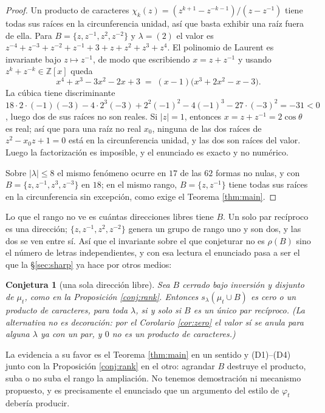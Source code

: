 \documentclass[11pt,reqno]{amsart}
\theoremstyle{plain}
\newtheorem{conjecture}[theorem]{Conjetura}
\theoremstyle{definition}
\newcommand{\ZZ}{\mathbb{Z}}
\newcommand{\zt}{\mu_t}
\begin{document}
\begin{proof}
Un producto de caracteres $\chi_k(z)=(z^{k+1}-z^{-k-1})/(z-z^{-1})$ tiene todas sus raíces en la
circunferencia unidad, así que basta exhibir una raíz fuera de ella. Para
$B=\{z,z^{-1},z^{2},z^{-2}\}$ y $\lambda=(2)$ el valor es
$z^{-4}+z^{-3}+z^{-2}+z^{-1}+3+z+z^{2}+z^{3}+z^{4}$. El polinomio de Laurent es invariante bajo
$z\mapsto z^{-1}$, de modo que escribiendo $x=z+z^{-1}$ y usando $z^{k}+z^{-k}\in\ZZ[x]$ queda
\[
x^{4}+x^{3}-3x^{2}-2x+3\;=\;(x-1)\bigl(x^{3}+2x^{2}-x-3\bigr).
\]
La cúbica tiene discriminante
$18\cdot2\cdot(-1)(-3)-4\cdot2^{3}(-3)+2^{2}(-1)^{2}-4(-1)^{3}-27\cdot(-3)^{2}=-31<0$, luego dos de
sus raíces no son reales. Si $|z|=1$, entonces $x=z+z^{-1}=2\cos\theta$ es real; así que para una
raíz no real $x_0$, ninguna de las dos raíces de $z^{2}-x_0z+1=0$ está en la circunferencia unidad, y
las dos son raíces del valor. Luego la factorización es imposible, y el enunciado es exacto y no
numérico.

Sobre $|\lambda|\le8$ el mismo fenómeno ocurre en $17$ de las $62$ formas no nulas, y con
$B=\{z,z^{-1},z^{3},z^{-3}\}$ en $18$; en el mismo rango, $B=\{z,z^{-1}\}$ tiene todas sus raíces en
la circunferencia sin excepción, como exige el Teorema \ref{thm:main}.
\end{proof}

Lo que el rango no ve es cuántas direcciones libres tiene $B$. Un solo par recíproco es una
dirección; $\{z,z^{-1},z^{2},z^{-2}\}$ genera un grupo de rango uno y son dos, y las dos se ven entre
sí. Así que el invariante sobre el que conjeturar no es $\rho(B)$ sino el número de letras
independientes, y con esa lectura el enunciado pasa a ser el que la \S\ref{sec:sharp} ya hace por
otros medios:

\begin{conjecture}[una sola dirección libre]\label{conj:rank2}
Sea $B$ cerrado bajo inversión y disjunto de $\zt$, como en la Proposición \ref{conj:rank}. Entonces
$s_\lambda(\zt\cup B)$ es cero o un producto de caracteres, para toda $\lambda$, si y solo si $B$ es
un único par recíproco. (La alternativa no es decoración: por el Corolario \ref{cor:zero} el valor sí
se anula para alguna $\lambda$ ya con un par, y $0$ no es un producto de caracteres.)
\end{conjecture}

La evidencia a su favor es el Teorema \ref{thm:main} en un sentido y (D1)--(D4) junto con la
Proposición \ref{conj:rank} en el otro: agrandar $B$ destruye el producto, suba o no suba el rango la
ampliación. No tenemos demostración ni mecanismo propuesto, y es precisamente el enunciado que un
argumento del estilo de $\varphi_t$ debería producir.
\end{document}
